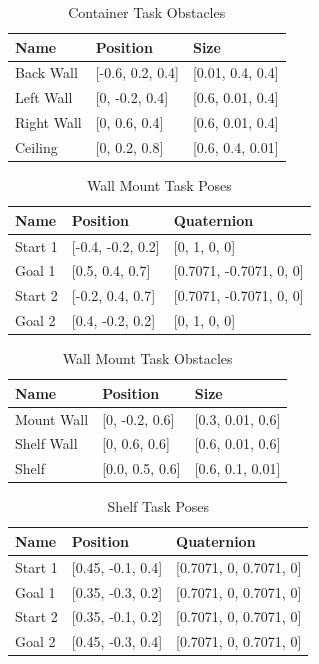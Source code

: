 \documentclass[letterpaper, 10 pt, conference]{ieeeconf}  %
\begin{document}
\begin{table}[H]
    \centering
    \caption{Container Task Obstacles}
    \label{tab:containerObstacles}
    \begin{tabular}{lll}
    \hline
    \textbf{Name} & \textbf{Position} & \textbf{Size} \\
    \hline
    Back Wall & [-0.6, 0.2, 0.4] & [0.01, 0.4, 0.4] \\
    Left Wall & [0, -0.2, 0.4] & [0.6, 0.01, 0.4] \\
    Right Wall & [0, 0.6, 0.4] & [0.6, 0.01, 0.4] \\
    Ceiling & [0, 0.2, 0.8] & [0.6, 0.4, 0.01] \\
    \hline
    \end{tabular}
\end{table}

\begin{table}[H]
    \centering
    \caption{Wall Mount Task Poses}
    \label{tab:wallMountPoses}
    \begin{tabular}{lll}
    \hline
    \textbf{Name} & \textbf{Position} & \textbf{Quaternion} \\
    \hline
    Start 1 & [-0.4, -0.2, 0.2] & [0, 1, 0, 0] \\
    Goal 1 & [0.5, 0.4, 0.7] & [0.7071, -0.7071, 0, 0] \\
    Start 2 & [-0.2, 0.4, 0.7] & [0.7071, -0.7071, 0, 0] \\
    Goal 2 & [0.4, -0.2, 0.2] & [0, 1, 0, 0] \\
    \hline
    \end{tabular}
\end{table}

\begin{table}[H]
    \centering
    \caption{Wall Mount Task Obstacles}
    \label{tab:wallMountObstacles}
    \begin{tabular}{lll}
    \hline
    \textbf{Name} & \textbf{Position} & \textbf{Size} \\
    \hline
    Mount Wall & [0, -0.2, 0.6] & [0.3, 0.01, 0.6] \\
    Shelf Wall & [0, 0.6, 0.6] & [0.6, 0.01, 0.6] \\
    Shelf & [0.0, 0.5, 0.6] & [0.6, 0.1, 0.01] \\
    \hline
    \end{tabular}
\end{table}

\begin{table}[H]
    \centering
    \caption{Shelf Task Poses}
    \label{tab:simpleShelfPoses}
    \begin{tabular}{lll}
    \hline
    \textbf{Name} & \textbf{Position} & \textbf{Quaternion} \\
    \hline
    Start 1 & [0.45, -0.1, 0.4] & [0.7071, 0, 0.7071, 0] \\
    Goal 1 & [0.35, -0.3, 0.2] & [0.7071, 0, 0.7071, 0] \\
    Start 2 & [0.35, -0.1, 0.2] & [0.7071, 0, 0.7071, 0] \\
    Goal 2 & [0.45, -0.3, 0.4] & [0.7071, 0, 0.7071, 0] \\
    \hline
    \end{tabular}
\end{table}
\end{document}

